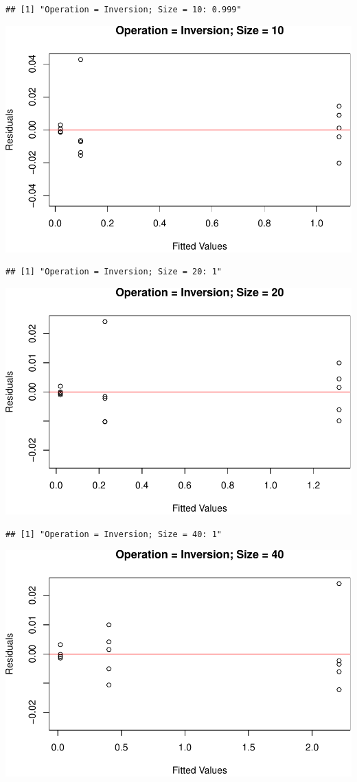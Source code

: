 \documentclass[
]{article}
\begin{document}
\begin{verbatim}
## [1] "Operation = Inversion; Size = 10: 0.999"
\end{verbatim}

\includegraphics{main_files/figure-latex/unnamed-chunk-20-17.pdf}

\begin{verbatim}
## [1] "Operation = Inversion; Size = 20: 1"
\end{verbatim}

\includegraphics{main_files/figure-latex/unnamed-chunk-20-18.pdf}

\begin{verbatim}
## [1] "Operation = Inversion; Size = 40: 1"
\end{verbatim}

\includegraphics{main_files/figure-latex/unnamed-chunk-20-19.pdf}
\end{document}
